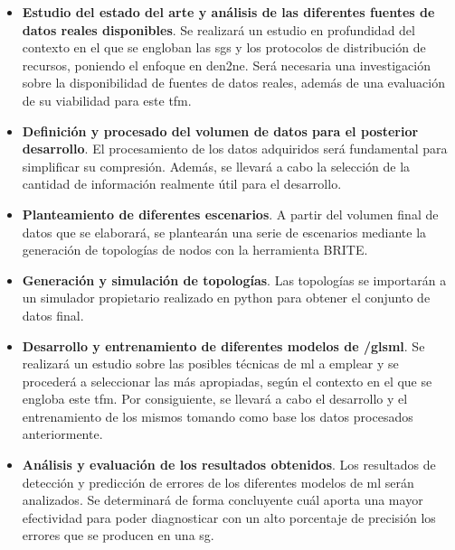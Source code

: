 \begin{itemize}
    \item \textbf{Estudio del estado del arte y análisis de las diferentes fuentes de datos reales disponibles}. Se realizará un estudio en profundidad del contexto en el que se engloban las \gls{sgs} y los protocolos de distribución de recursos, poniendo el enfoque en  \gls{den2ne}. Será necesaria una investigación sobre la disponibilidad de  fuentes de datos reales, además de una evaluación de su viabilidad para este \gls{tfm}.
    
    \item \textbf{Definición y procesado del volumen de datos para el posterior desarrollo}. El procesamiento de los datos adquiridos será fundamental para simplificar su compresión. Además, se llevará a cabo la selección de la cantidad de información realmente útil para el desarrollo.    

    \item \textbf{Planteamiento de diferentes escenarios}. A partir del volumen final de datos que se elaborará, se plantearán una serie de escenarios mediante la generación de topologías de nodos con la herramienta BRITE. %
    
    \item \textbf{Generación y simulación de topologías}. Las topologías se importarán a un simulador propietario realizado en python para obtener el conjunto de datos final.
    
    \item \textbf{Desarrollo y entrenamiento de diferentes modelos de /gls{ml}}. Se realizará un estudio sobre las posibles técnicas de \gls{ml} a emplear y se procederá a seleccionar las más apropiadas, según el contexto en el que se engloba este \gls{tfm}. Por consiguiente, se llevará a cabo el desarrollo y el entrenamiento de los mismos tomando como base los datos procesados anteriormente. 
    
    \item \textbf{Análisis y evaluación de los resultados obtenidos}. Los resultados de detección y predicción de errores de los diferentes modelos de \gls{ml} serán analizados. Se determinará de forma concluyente cuál aporta una mayor efectividad para poder diagnosticar con un alto porcentaje de precisión los errores que se producen en una \gls{sg}.
    
\end{itemize}





